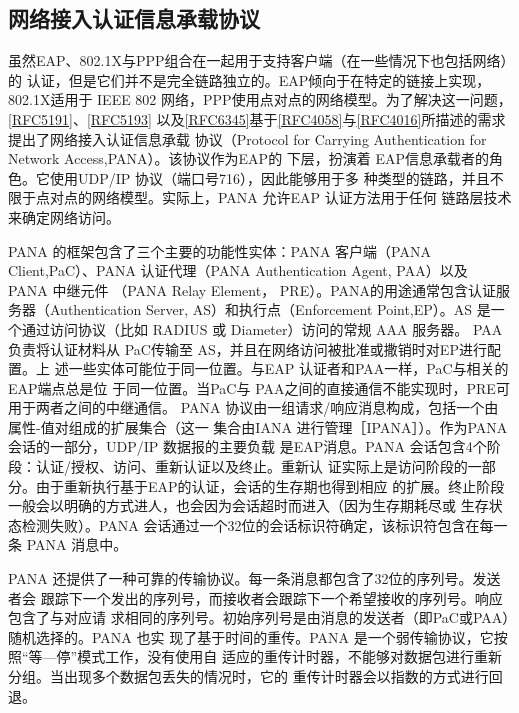 \subsection{网络接入认证信息承载协议}

虽然EAP、802.1X与PPP组合在一起用于支持客户端（在一些情况下也包括网络）的
认证，但是它们并不是完全链路独立的。EAP倾向于在特定的链接上实现，802.1X适用于
IEEE 802 网络，PPP使用点对点的网络模型。为了解决这一问题，\href{https://www.rfc-editor.org/rfc/rfc5191}{[RFC5191]}、\href{https://www.rfc-editor.org/rfc/rfc5193}{[RFC5193]}
以及\href{https://www.rfc-editor.org/rfc/rfc6345}{[RFC6345]}基于\href{https://www.rfc-editor.org/rfc/rfc4058}{[RFC4058]}与\href{https://www.rfc-editor.org/rfc/rfc4016}{[RFC4016]}所描述的需求提出了网络接入认证信息承载
协议（Protocol for Carrying Authentication for Network Access,PANA）。该协议作为EAP的
下层，扮演着 EAP信息承载者的角色。它使用UDP/IP 协议（端口号716），因此能够用于多
种类型的链路，并且不限于点对点的网络模型。实际上，PANA 允许EAP 认证方法用于任何
链路层技术来确定网络访问。

PANA 的框架包含了三个主要的功能性实体：PANA 客户端（PANA Client,PaC）、PANA
认证代理（PANA Authentication Agent, PAA）以及 PANA 中继元件 （PANA Relay Element，
PRE）。PANA的用途通常包含认证服务器（Authentication Server, AS）和执行点（Enforcement
Point,EP）。AS 是一个通过访问协议（比如 RADIUS 或 Diameter）访问的常规 AAA 服务器。
PAA负责将认证材料从 PaC传输至 AS，并且在网络访问被批准或撒销时对EP进行配置。上
述一些实体可能位于同一位置。与EAP 认证者和PAA一样，PaC与相关的EAP端点总是位
于同一位置。当PaC与 PAA之间的直接通信不能实现时，PRE可用于两者之间的中继通信。
PANA 协议由一组请求/响应消息构成，包括一个由属性-值对组成的扩展集合（这一
集合由IANA 进行管理［IPANA］）。作为PANA会话的一部分，UDP/IP 数据报的主要负载
是EAP消息。PANA 会话包含4个阶段：认证/授权、访问、重新认证以及终止。重新认
证实际上是访问阶段的一部分。由于重新执行基于EAP的认证，会话的生存期也得到相应
的扩展。终止阶段一般会以明确的方式进人，也会因为会话超时而进入（因为生存期耗尽或
生存状态检测失败）。PANA 会话通过一个32位的会话标识符确定，该标识符包含在每一条
PANA 消息中。

PANA 还提供了一种可靠的传输协议。每一条消息都包含了32位的序列号。发送者会
跟踪下一个发出的序列号，而接收者会跟踪下一个希望接收的序列号。响应包含了与对应请
求相同的序列号。初始序列号是由消息的发送者（即PaC或PAA）随机选择的。PANA 也实
现了基于时间的重传。PANA 是一个弱传输协议，它按照“等—停”模式工作，没有使用自
适应的重传计时器，不能够对数据包进行重新分组。当出现多个数据包丢失的情况时，它的
重传计时器会以指数的方式进行回退。

